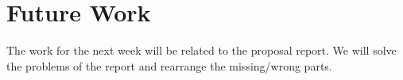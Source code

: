 \section{Future Work}
\label{sec:futureWork}
The work for the next week will be related to the proposal report. We will solve the problems of the report and rearrange the missing/wrong parts.